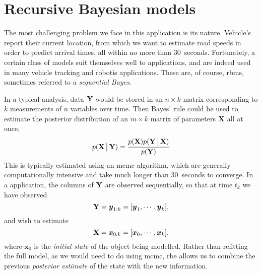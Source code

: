 \section{Recursive Bayesian models}
\label{sec:recursive-bayes}

The most challenging problem we face in this application is its \rt{} nature. Vehicle's report their current location, from which we want to estimate road speeds in order to predict arrival times, all within no more than 30~seconds. Fortunately, a certain class of models suit themselves well to \rt{} applications, and are indeed used in many vehicle tracking and robotis applications. These are, of course, \glspl{rbm}, sometimes referred to a \emph{sequential Bayes}.


In a typical analysis, data $\mathbf{Y}$ would be stored in an $n\times k$ matrix corresponding to $k$ measurements of $n$ variables over time. Then Bayes' rule could be used to estimate the posterior distribution of an $m\times k$ matrix of parameters $\mathbf{X}$ all at once,
\begin{equation}
\label{eq:bayes}
p(\mathbf{X}\,\big|\,{}\mathbf{Y}) =
\frac{
    p(\mathbf{X})
    p(\mathbf{Y}\,\big|\,{}\mathbf{X})
}{
    p(\mathbf{Y})
}
\end{equation}
This is typically estimated using an \gls{mcmc} algorithm, which are generally computationally intensive and take much longer than 30~seconds to converge.
In a \rt{} application, the columns of $\mathbf{Y}$ are observed sequentially, so that at time $t_k$ we have observed
\begin{equation}
\label{eq:bayes_y_vector}
\mathbf{Y} = \boldsymbol{y}_{1:k} = [\boldsymbol{y}_1,\cdots,\boldsymbol{y}_k],
\end{equation}
and wish to estimate
\begin{equation}
\label{eq:bayes_x_vector}
\mathbf{X} = \boldsymbol x_{0:k} = [\boldsymbol{x}_0,\cdots,\boldsymbol{x}_k],
\end{equation}
where $\boldsymbol{x}_0$ is the \emph{initial state} of the object being modelled. Rather than refitting the full model, as we would need to do using \gls{mcmc}, \gls{rbe} allows us to combine the previous \emph{posterior estimate} of the state with the new information.

